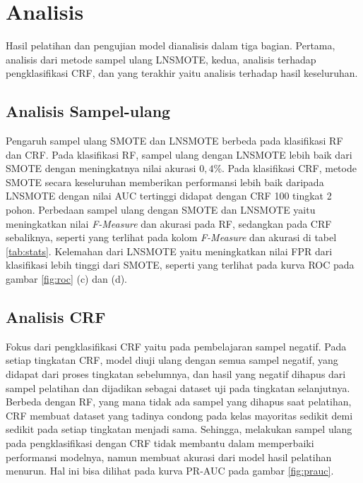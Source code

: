 \chapter{Analisis}

Hasil pelatihan dan pengujian model dianalisis dalam tiga bagian.
Pertama, analisis dari metode sampel ulang LNSMOTE, kedua, analisis terhadap
pengklasifikasi CRF, dan yang terakhir yaitu analisis terhadap hasil
keseluruhan.

\section{Analisis Sampel-ulang}

Pengaruh sampel ulang SMOTE dan LNSMOTE berbeda pada klasifikasi RF dan CRF.
Pada klasifikasi RF, sampel ulang dengan LNSMOTE lebih baik dari SMOTE dengan
meningkatnya nilai akurasi $0,4\%$.
Pada klasifikasi CRF, metode SMOTE secara keseluruhan memberikan performansi
lebih baik daripada LNSMOTE dengan nilai AUC tertinggi didapat dengan CRF 100
tingkat 2 pohon.
Perbedaan  sampel ulang dengan SMOTE dan LNSMOTE yaitu meningkatkan nilai
\textit{F-Measure} dan akurasi pada RF, sedangkan pada CRF sebaliknya, seperti
yang terlihat pada kolom \textit{F-Measure} dan akurasi di tabel
\ref{tab:stats}.
Kelemahan dari LNSMOTE yaitu meningkatkan nilai FPR dari
klasifikasi lebih tinggi dari SMOTE, seperti yang terlihat pada kurva ROC pada
gambar \ref{fig:roc} (c) dan (d).



\section{Analisis CRF}

Fokus dari pengklasifikasi CRF yaitu pada pembelajaran sampel negatif.
Pada setiap tingkatan CRF, model diuji ulang dengan semua sampel negatif, yang
didapat dari proses tingkatan sebelumnya, dan hasil yang negatif dihapus dari
sampel pelatihan dan dijadikan sebagai dataset uji pada tingkatan selanjutnya.
Berbeda dengan RF, yang mana tidak ada sampel yang dihapus saat
pelatihan, CRF membuat dataset yang tadinya condong pada kelas mayoritas
sedikit demi sedikit pada setiap tingkatan menjadi sama.
Sehingga, melakukan sampel ulang pada pengklasifikasi dengan CRF tidak membantu
dalam memperbaiki performansi modelnya, namun membuat akurasi dari model hasil
pelatihan menurun.
Hal ini bisa dilihat pada kurva PR-AUC pada gambar \ref{fig:prauc}.

